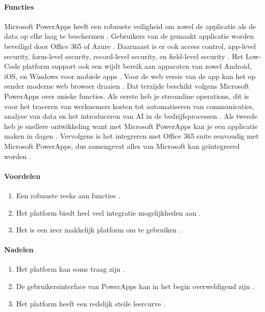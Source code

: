 \paragraph{Functies}
Microsoft PowerApps heeft een robuuste veiligheid om zowel de applicatie als de data op elke laag te beschermen \autocite{Nguyen}.
Gebruikers van de gemaakt applicatie worden beveiligd door Office 365 of Azure \autocite{Nguyen}. Daarnaast is er ook access control, app-level security, form-level security, record-level security, en field-level security  \autocite{Nguyen}.
Het Low-Code platform support ook een wijdt bereik aan apparaten van zowel Android, iOS, en Windows voor mobiele apps \autocite{Nguyen}.
Voor de web versie van de app kan het op eender moderne web browser draaien \autocite{Nguyen}. Dat terzijde beschikt volgens \textcite{Gupta2023} Microsoft PowerApps over unieke functies. Als eerste heb je 
streamline operations, dit is voor het traceren van werknemers kosten tot automatiseren van communicaties, analyse van data en het introduceren van AI in de bedrijfsprocessen \autocite{Gupta2023}.
Als tweede heb je snellere ontwikkeling want met Microsoft PowerApps kan je een applicatie maken in dagen \autocite{Gupta2023}. Vervolgens is het integreren met Office 365 suite eenvoudig met Microsoft PowerApps,
 dus samengevat alles van Microsoft kan geïntegreerd worden \autocite{Gupta2023}.

 \paragraph*{Voordelen}
\begin{enumerate}
    \item Een robuuste reeks aan functies \autocite{Marvin2018}.
    \item Het platform biedt heel veel integratie mogelijkheden aan \autocite{Marvin2018}.
    \item Het is een zeer makkelijk platform om te gebruiken \autocite{Marvin2018}.
\end{enumerate}


\paragraph*{Nadelen}
\begin{enumerate}
    \item Het platform kan soms traag zijn \autocite{Marvin2018}.
    \item De gebruikersinterface van PowerApps kan in het begin overweldigend zijn \autocite{Marvin2018}.
    \item Het platform heeft een redelijk steile leercurve \autocite{Marvin2018}.
\end{enumerate}

